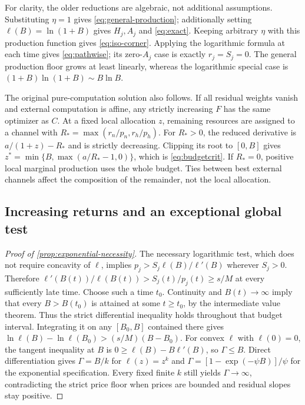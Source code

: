 \documentclass[11pt,a4paper]{article}
\theoremstyle{definition}\newtheorem{definition}{Definition}
\begin{document}
For clarity, the older reductions are algebraic, not additional
assumptions. Substituting $\eta=1$ gives
\cref{eq:general-production}; additionally setting
$\ell(B)=\ln(1+B)$ gives $H_j,A_j$ and \cref{eq:exact}.
Keeping arbitrary $\eta$ with this production function gives
\cref{eq:iso-corner}. Applying the logarithmic formula at each time
gives \cref{eq:pathwise}; its zero-$A_j$ case is exactly
$r_j=S_j=0$. The general production floor grows at least linearly,
whereas the logarithmic special case is $(1+B)\ln(1+B)\sim B\ln B$.

The original pure-computation solution also follows. If all residual
weights vanish and external computation is affine, any strictly
increasing $F$ has the same optimizer as $C$. At a fixed local
allocation $z$, remaining resources are assigned to a channel with
$R_*=\max(r_n/p_n,r_h/p_h)$. For $R_*>0$, the reduced derivative is
$a/(1+z)-R_*$ and is strictly decreasing. Clipping its root to $[0,B]$
gives $z^*=\min\{B,\max(a/R_*-1,0)\}$, which is
\cref{eq:budgetcrit}. If $R_*=0$, positive local marginal production
uses the whole budget. Ties between best external channels affect the
composition of the remainder, not the local allocation.

\subsection{Increasing returns and an exceptional global test}
\label{app:returns-proof}
\begin{proof}[Proof of \cref{prop:exponential-necessity}]
The necessary logarithmic test, which does not require concavity of
$\ell$, implies $p_j>S_j\ell(B)/\ell'(B)$ wherever $S_j>0$.
Therefore $\ell'(B(t))/\ell(B(t))>S_j(t)/p_j(t)\geq s/M$
at every sufficiently late time. Choose such a time $t_0$.
Continuity and $B(t)\to\infty$ imply that every $B>B(t_0)$ is attained
at some $t\geq t_0$, by the intermediate value theorem. Thus the
strict differential inequality holds throughout that budget interval.
Integrating it on any $[B_0,B]$ contained there gives
$\ln\ell(B)-\ln\ell(B_0)>(s/M)(B-B_0)$.
For convex $\ell$ with $\ell(0)=0$, the tangent inequality at $B$
is $0\geq\ell(B)-B\ell'(B)$, so $\Gamma\leq B$.
Direct differentiation gives $\Gamma=B/k$ for $\ell(z)=z^k$ and
$\Gamma=[1-\exp(-\psi B)]/\psi$ for the exponential specification.
Every fixed finite $k$ still yields $\Gamma\to\infty$, contradicting
the strict price floor when prices are bounded and residual slopes stay
positive.
\end{proof}
\end{document}
